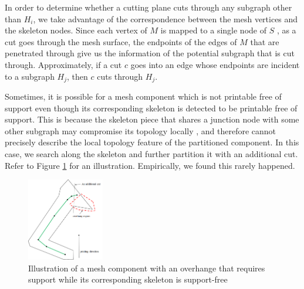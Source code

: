 In order to determine whether a cutting plane cuts through any subgraph other than $H_i$, we take advantage of the correspondence between the mesh vertices and the skeleton nodes. Since each vertex of $M$ is mapped to a single node of $S$ \cite{AuTCCL08}, as a cut goes through the mesh surface, the endpoints of the edges of $M$ that are penetrated through give us the information of the potential subgraph that is cut through. Approximately, if a cut $c$ goes into an edge whose endpoints are incident to a subgraph $H_j$, then $c$ cuts through $H_j$.









Sometimes, it is possible for a mesh component which is not printable free of support even though its corresponding skeleton is detected to be printable free of support. This is because the skeleton piece that shares a junction node with some other subgraph may compromise its topology locally \cite{AuTCCL08}, and therefore cannot precisely describe the local topology feature of the partitioned component. In this case, we search along the skeleton and further partition it with an additional cut. Refer to Figure \ref{fig:arm} for an illustration. Empirically, we found this rarely happened.

\begin{figure}[tbp]
  \centering
  \includegraphics[width=0.3\textwidth]{figs/arm.png}
  \caption{\label{fig:arm}%
           Illustration of a mesh component with an overhange that requires support while its corresponding skeleton is support-free}
\end{figure}









